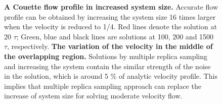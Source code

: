 \documentclass[preprint,12pt]{elsarticle}
\begin{document}
\begin{figure}
\centering
{}
\hskip 1cm
\vskip-0.2cm
\caption[]{\small {} {\bf A Couette flow profile in increased system size.}  Accurate flow profile can be obtained by increasing the system size 16 times larger when the velocity is reduced to 1/4. Red lines denote the solution at 20 $\tau$; Green, blue and black lines are solutions at 100, 200 and 1500 $\tau$, respectively. 
 {\bf The variation of the velocity in the middle of the overlapping region.} Solutions by multiple replica sampling and increasing the system contain the similar strength of the noise in the solution, which is around 5 $\%$ of analytic velocity profile. This implies that multiple replica sampling approach can replace the increase of system size for solving moderate velocity flow.}
\label{increase_system}
\end{figure}
\end{document}
